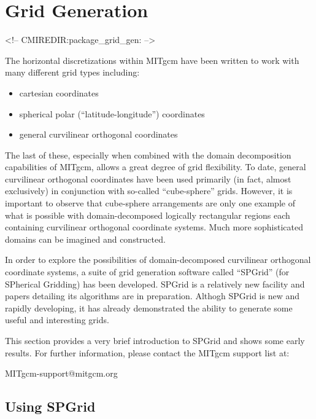 
\section{Grid Generation}
\label{sec:pkg:grid_gen}
\begin{rawhtml}
<!-- CMIREDIR:package_grid_gen: -->
\end{rawhtml}


The horizontal discretizations within MITgcm have been written to work
with many different grid types including:
\begin{itemize}
\item cartesian coordinates
\item spherical polar (``latitude-longitude'') coordinates
\item general curvilinear orthogonal coordinates
\end{itemize}
The last of these, especially when combined with the domain
decomposition capabilities of MITgcm, allows a great degree of grid
flexibility.  To date, general curvilinear orthogonal coordinates have
been used primarily (in fact, almost exclusively) in conjunction with
so-called ``cube-sphere'' grids.  However, it is important to observe
that cube-sphere arrangements are only one example of what is possible
with domain-decomposed logically rectangular regions each containing
curvilinear orthogonal coordinate systems.  Much more sophisticated 
domains can be imagined and constructed.

In order to explore the possibilities of domain-decomposed curvilinear
orthogonal coordinate systems, a suite of grid generation software
called ``SPGrid'' (for SPherical Gridding) has been developed.  SPGrid
is a relatively new facility and papers detailing its algorithms are
in preparation.  Althogh SPGrid is new and rapidly developing, it has
already demonstrated the ability to generate some useful and
interesting grids.

This section provides a very brief introduction to SPGrid and shows
some early results.  For further information, please contact the
MITgcm support list at:
\begin{center}
  MITgcm-support@mitgcm.org
\end{center}


\subsection{Using SPGrid}

